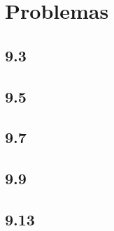 \documentclass[12pt,oneside,FLEQN]{report}
\begin{document}
{\section{Problemas}
	\subsection{9.3}
		
	\subsection{9.5}
		
	\subsection{9.7}
	\subsection{9.9}
	\subsection{9.13}
}
\end{document}

